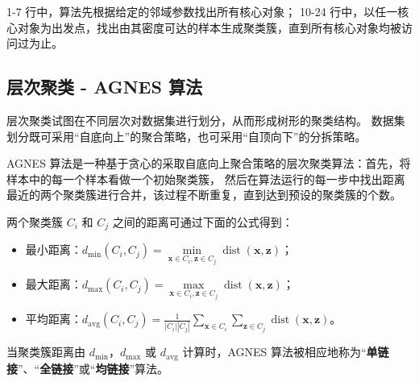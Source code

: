 1-7 行中，算法先根据给定的邻域参数找出所有核心对象；
10-24 行中，以任一核心对象为出发点，找出由其密度可达的样本生成聚类簇，直到所有核心对象均被访问过为止。

\subsection{层次聚类 - AGNES 算法}
层次聚类试图在不同层次对数据集进行划分，从而形成树形的聚类结构。
数据集划分既可采用“自底向上”的聚合策略，也可采用“自顶向下”的分拆策略。

AGNES 算法是一种基于贪心的采取自底向上聚合策略的层次聚类算法：首先，将样本中的每一个样本看做一个初始聚类簇，
然后在算法运行的每一步中找出距离最近的两个聚类簇进行合并，该过程不断重复，直到达到预设的聚类簇的个数。

两个聚类簇 $C_i$ 和 $C_j$ 之间的距离可通过下面的公式得到：
\begin{itemize}
    \item 最小距离：$d_{\min}(C_i, C_j) = \min\limits_{\boldsymbol{x} \in C_i, \boldsymbol{z} \in C_j} 
    \operatorname{dist}(\boldsymbol{x}, \boldsymbol{z})$；
    \item 最大距离：$d_{\max}(C_i, C_j) = \max\limits_{\boldsymbol{x} \in C_i, \boldsymbol{z} \in C_j} 
    \operatorname{dist}(\boldsymbol{x}, \boldsymbol{z})$；
    \item 平均距离：$\displaystyle d_{\text {avg}}\left(C_{i}, C_{j}\right)=\frac{1}{\left|C_{i}\right|\left|C_{j}\right|} \sum_{\boldsymbol{x} \in C_{i}} \sum_{\boldsymbol{z} \in C_{j}} 
    \operatorname{dist}(\boldsymbol{x}, \boldsymbol{z})$。
\end{itemize}

当聚类簇距离由 $d_{\min}$，$d_{\max}$ 或 $d_{\text{avg}}$ 
计算时，AGNES 算法被相应地称为“\textbf{单链接}”、“\textbf{全链接}”或“\textbf{均链接}”算法。

